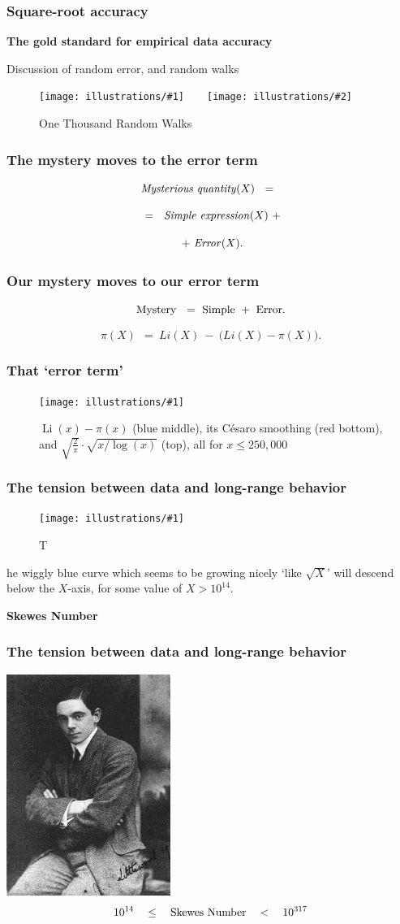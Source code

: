 \documentclass{beamer}
\DeclareMathOperator{\Li}{Li}
\newcommand{\ill}[3]{%
   \begin{figure}[H]%
   \vspace{-2ex}
   \centering%
   \texttt{[image: illustrations/\#1]}%
   \caption{#3}%
   \vspace{-2ex}
    \end{figure}}
\newcommand{\illtwo}[4]{%
   \begin{figure}[H]\centering%
   \texttt{[image: illustrations/\#1]}$\qquad$\texttt{[image: illustrations/\#2]}%
   \caption{#4}%
    \end{figure}}
\begin{document}
\begin{frame}\frametitle{\bf Square-root accuracy}

{\Huge {\bf The gold standard for empirical data accuracy} \vskip10pt

      Discussion of random error, and random walks


\illtwo{random_walks-1000}{random_walks-1000-mean}{.45}{One Thousand Random Walks\label{fig:random_walks_1000}}}\end{frame}
\begin{frame}\frametitle{\bf {The mystery moves to  the error term}}

{\Huge  $${\it Mysterious\  quantity}(X)\ \ = \ \ $$

$$\ \ =\ \ {\it Simple \ expression}(X) \ + \ $$

$$ \ + \ {\it Error}(X).$$}\end{frame}
\begin{frame}\frametitle{\bf {Our mystery moves to  our error term}}

{\Huge $${\rm Mystery}\ \ = \ {\rm Simple}  \ + \ {\rm Error}.$$

$${\pi}(X)\ \ = \ {Li}(X)  \ - \ \big({Li}(X)-\pi(X)\big).$$}\end{frame}



\begin{frame}\frametitle{\bf That `error term'}
\ill{li-minus-pi-250000}{.9}{$\Li(x)-\pi(x)$ (blue middle), its C{\'e}saro smoothing (red bottom), and
$\sqrt{\frac{2}{\pi}}\cdot \sqrt{x/\log(x)}$ (top), all for $x\leq 250{,}000$\label{fig:li-minus-pi-250000}}\end{frame}
\begin{frame}\frametitle{\bf The tension between data and long-range behavior}

\ill{li-minus-pi-250000}{.2}

 The wiggly blue curve which seems to be growing nicely  `like ${\sqrt X}$' will descend below the $X$-axis, for some value of $X > 10^{14}$.
\vskip20pt
\centerline{\bf Skewes Number}\end{frame}
\begin{frame}\frametitle{\bf The tension between data and long-range behavior}

\hskip100pt \includegraphics[width=0.4\textwidth]{illustrations/littlewood}
{
$$
10^{14}\ \ \ \le\ \ \ {\rm Skewes\ Number}\ \ \ <\ \ \    10^{317}
$$} \end{frame}
\end{document}
